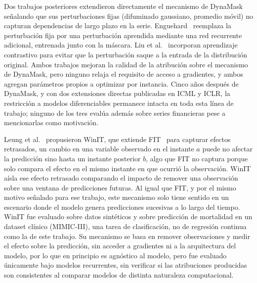 \documentclass[conference, letterpaper]{IEEEtran}
\begin{document}
Dos trabajos posteriores extendieron directamente el mecanismo de DynaMask señalando que sus perturbaciones fijas (difuminado gaussiano, promedio móvil) no capturan dependencias de largo plazo en la serie. Enguehard~\cite{enguehard2023} reemplaza la perturbación fija por una perturbación aprendida mediante una red recurrente adicional, entrenada junto con la máscara. Liu et al.~\cite{liu2024contralsp} incorporan aprendizaje contrastivo para evitar que la perturbación saque a la entrada de la distribución original. Ambos trabajos mejoran la calidad de la atribución sobre el mecanismo de DynaMask, pero ninguno relaja el requisito de acceso a gradientes, y ambos agregan parámetros propios a optimizar por instancia. Cinco años después de DynaMask, y con dos extensiones directas publicadas en ICML y ICLR, la restricción a modelos diferenciables permanece intacta en toda esta línea de trabajo; ninguno de los tres evalúa además sobre series financieras pese a mencionarlas como motivación.

Leung et al.~\cite{leung2023winit} propusieron WinIT, que extiende
FIT~\cite{tonekaboni2020} para capturar efectos retrasados, un
cambio en una variable observado en el instante $a$ puede no
afectar la predicción sino hasta un instante posterior $b$, algo
que FIT no captura porque solo compara el efecto en el mismo
instante en que ocurrió la observación. WinIT aísla ese efecto
retrasado comparando el impacto de remover una observación sobre
una ventana de predicciones futuras. Al igual que FIT, y por el
mismo motivo señalado para ese trabajo, este mecanismo solo tiene
sentido en un escenario donde el modelo genera predicciones
sucesivas a lo largo del tiempo. WinIT fue evaluado sobre datos
sintéticos y sobre predicción de mortalidad en un dataset clínico
(MIMIC-III), una tarea de clasificación, no de regresión continua
como la de este trabajo. Su mecanismo se basa en remover
observaciones y medir el efecto sobre la predicción, sin acceder
a gradientes ni a la arquitectura del modelo, por lo que en
principio es agnóstico al modelo, pero fue evaluado únicamente bajo
modelos recurrentes, sin verificar si las atribuciones producidas
son consistentes al comparar modelos de distinta naturaleza
computacional.
\end{document}

